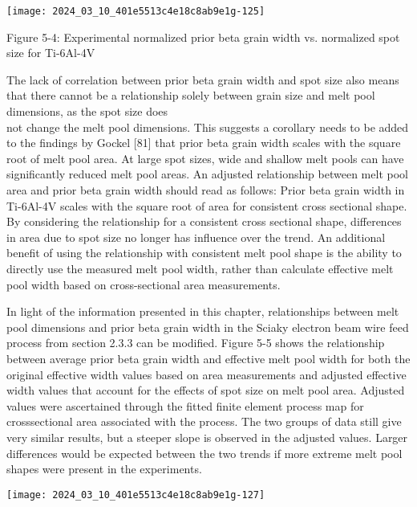 \documentclass[10pt]{article}
\begin{document}
\begin{center}
\texttt{[image: 2024\_03\_10\_401e5513c4e18c8ab9e1g-125]}
\end{center}

Figure 5-4: Experimental normalized prior beta grain width vs. normalized spot size for Ti-6Al-4V

The lack of correlation between prior beta grain width and spot size also means that there cannot be a relationship solely between grain size and melt pool dimensions, as the spot size does\\
not change the melt pool dimensions. This suggests a corollary needs to be added to the findings by Gockel [81] that prior beta grain width scales with the square root of melt pool area. At large spot sizes, wide and shallow melt pools can have significantly reduced melt pool areas. An adjusted relationship between melt pool area and prior beta grain width should read as follows: Prior beta grain width in Ti-6Al-4V scales with the square root of area for consistent cross sectional shape. By considering the relationship for a consistent cross sectional shape, differences in area due to spot size no longer has influence over the trend. An additional benefit of using the relationship with consistent melt pool shape is the ability to directly use the measured melt pool width, rather than calculate effective melt pool width based on cross-sectional area measurements.

In light of the information presented in this chapter, relationships between melt pool dimensions and prior beta grain width in the Sciaky electron beam wire feed process from section 2.3.3 can be modified. Figure 5-5 shows the relationship between average prior beta grain width and effective melt pool width for both the original effective width values based on area measurements and adjusted effective width values that account for the effects of spot size on melt pool area. Adjusted values were ascertained through the fitted finite element process map for crosssectional area associated with the process. The two groups of data still give very similar results, but a steeper slope is observed in the adjusted values. Larger differences would be expected between the two trends if more extreme melt pool shapes were present in the experiments.

\begin{center}
\texttt{[image: 2024\_03\_10\_401e5513c4e18c8ab9e1g-127]}
\end{center}
\end{document}

